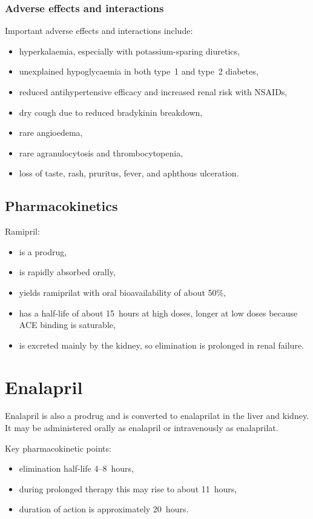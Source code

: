 \documentclass[11pt,a4paper]{article}
\begin{document}
\subsubsection{Adverse effects and interactions}

Important adverse effects and interactions include:
\begin{itemize}
    \item hyperkalaemia, especially with potassium-sparing diuretics,
    \item unexplained hypoglycaemia in both type~1 and type~2 diabetes,
    \item reduced antihypertensive efficacy and increased renal risk with NSAIDs,
    \item dry cough due to reduced bradykinin breakdown,
    \item rare angioedema,
    \item rare agranulocytosis and thrombocytopenia,
    \item loss of taste, rash, pruritus, fever, and aphthous ulceration.
\end{itemize}

\subsection{Pharmacokinetics}

Ramipril:
\begin{itemize}
    \item is a prodrug,
    \item is rapidly absorbed orally,
    \item yields ramiprilat with oral bioavailability of about 50\%,
    \item has a half-life of about 15~hours at high doses, longer at low doses because ACE binding is saturable,
    \item is excreted mainly by the kidney, so elimination is prolonged in renal failure.
\end{itemize}

\section{Enalapril}

Enalapril is also a prodrug and is converted to enalaprilat in the liver and kidney. It may be administered orally as enalapril or intravenously as enalaprilat.

Key pharmacokinetic points:
\begin{itemize}
    \item elimination half-life 4--8~hours,
    \item during prolonged therapy this may rise to about 11~hours,
    \item duration of action is approximately 20~hours.
\end{itemize}
\end{document}
